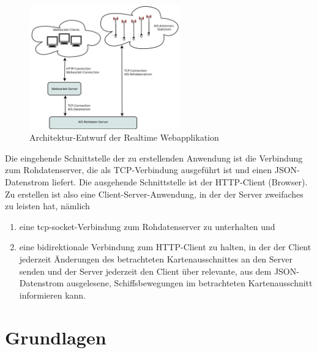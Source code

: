 \begin{figure}
  \begin{center}
    \includegraphics[width=0.58\textwidth]{images/Exposee_graphik_Realtimeapp}
  \end{center}
  \caption{Architektur-Entwurf der Realtime Webapplikation}
\end{figure}
Die eingehende Schnittstelle der zu erstellenden Anwendung ist die Verbindung zum Rohdatenserver, die als TCP-Verbindung ausgeführt ist und einen JSON-Datenstrom liefert.
Die ausgehende Schnittstelle ist der HTTP-Client (Browser).
Zu erstellen ist also eine Client-Server-Anwendung, in der der Server zweifaches zu leisten hat, nämlich 
\begin{enumerate}
 \item eine tcp-socket-Verbindung zum Rohdatenserver zu unterhalten und
  \item eine bidirektionale Verbindung zum HTTP-Client zu halten, in der der Client jederzeit Änderungen des betrachteten Kartenausschnittes an den Server senden und der Server jederzeit den Client über relevante, aus dem JSON-Datenstrom ausgelesene, Schiffsbewegungen im betrachteten Kartenausschnitt informieren kann.
\end{enumerate}


\chapter{Grundlagen}\label{s.Grundlagen}
